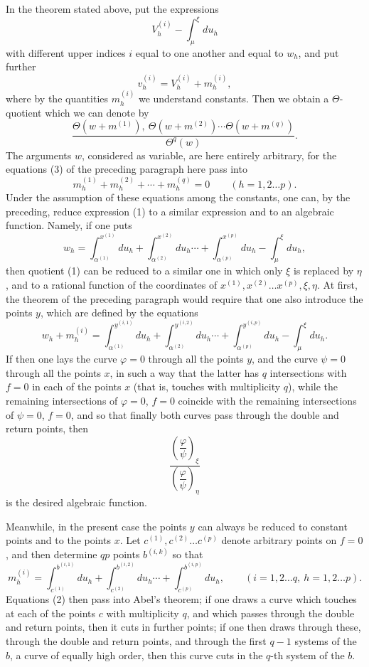 \documentclass[10pt]{article}
\begin{document}
In the theorem stated above, put the expressions
\[
V_h^{(i)}-\int_{\mu}^{\xi}du_h
\]
with different upper indices \(i\) equal to one another and equal to \(w_h\), and put further
\[
v_h^{(i)}=V_h^{(i)}+m_h^{(i)},
\]
where by the quantities \(m_h^{(i)}\) we understand constants. Then we obtain a \(\Theta\)-quotient which we can denote by
\[
\tag{1}
\frac{\Theta(w+m^{(1)}),\ \Theta(w+m^{(2)})\cdots\Theta(w+m^{(q)})}{\Theta^{q}(w)}.
\]
The arguments \(w\), considered as variable, are here entirely arbitrary, for the equations (3) of the preceding paragraph here pass into
\[
\tag{2}
m_h^{(1)}+m_h^{(2)}+\cdots+m_h^{(q)}=0
\qquad(h=1,2\ldots p).
\]
Under the assumption of these equations among the constants, one can, by the preceding, reduce expression (1) to a similar expression and to an algebraic function. Namely, if one puts
\[
\tag{3}
w_h=\int_{\alpha^{(1)}}^{x^{(1)}}du_h+
\int_{\alpha^{(2)}}^{x^{(2)}}du_h\cdots+
\int_{\alpha^{(p)}}^{x^{(p)}}du_h-
\int_{\mu}^{\xi}du_h,
\]
then quotient (1) can be reduced to a similar one in which only \(\xi\) is replaced by \(\eta\), and to a rational function of the coordinates of \(x^{(1)},x^{(2)}\ldots x^{(p)},\xi,\eta\). At first, the theorem of the preceding paragraph would require that one also introduce the points \(y\), which are defined by the equations
\[
\tag{4}
w_h+m_h^{(i)}=\int_{\alpha^{(1)}}^{y^{(i,1)}}du_h+
\int_{\alpha^{(2)}}^{y^{(i,2)}}du_h\cdots+
\int_{\alpha^{(p)}}^{y^{(i,p)}}du_h-
\int_{\mu}^{\xi}du_h.
\]
If then one lays the curve \(\varphi=0\) through all the points \(y\), and the curve \(\psi=0\) through all the points \(x\), in such a way that the latter has \(q\) intersections with \(f=0\) in each of the points \(x\) (that is, touches with multiplicity \(q\)), while the remaining intersections of \(\varphi=0\), \(f=0\) coincide with the remaining intersections of \(\psi=0\), \(f=0\), and so that finally both curves pass through the double and return points, then
\[
\frac{\left(\dfrac{\varphi}{\psi}\right)_{\xi}}
     {\left(\dfrac{\varphi}{\psi}\right)_{\eta}}
\]
is the desired algebraic function.

Meanwhile, in the present case the points \(y\) can always be reduced to constant points and to the points \(x\). Let \(c^{(1)},c^{(2)}\ldots c^{(p)}\) denote arbitrary points on \(f=0\), and then determine \(q p\) points \(b^{(i,k)}\) so that
\[
\tag{5}
m_h^{(i)}=\int_{c^{(1)}}^{b^{(i,1)}}du_h+
\int_{c^{(2)}}^{b^{(i,2)}}du_h\cdots+
\int_{c^{(p)}}^{b^{(i,p)}}du_h,
\qquad (i=1,2\ldots q,\ h=1,2\ldots p).
\]
Equations (2) then pass into Abel's theorem; if one draws a curve which touches at each of the points \(c\) with multiplicity \(q\), and which passes through the double and return points, then it cuts in further points; if one then draws through these, through the double and return points, and through the first \(q-1\) systems of the \(b\), a curve of equally high order, then this curve cuts in the \(q\)-th system of the \(b\).
\end{document}
